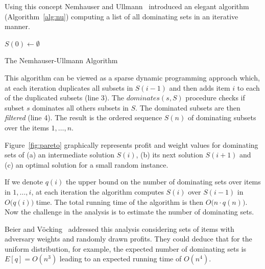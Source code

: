 \documentclass{article}
\begin{document}
Using this concept Nemhauser and Ullmann~\cite{nemhauser1969discrete} introduced an elegant
algorithm (Algorithm~\ref{alg:nu}) computing a list of all dominating sets in an iterative manner.

\begin{algorithm}[H]
 $S(0) \leftarrow \emptyset $\;
 \caption{The Nemhauser-Ullmann Algorithm}
 \label{alg:nu}
\end{algorithm}

This algorithm can be viewed as a sparse dynamic programming approach which,
at each iteration duplicates all subsets in $S(i-1)$ and then adds item $i$
to each of the duplicated subsets (line 3).
The $dominates(s, S)$ procedure checks if subset $s$ dominates all others subsets in $S$.
The dominated subsets are then {\it filtered} (line 4).
The result is the ordered sequence $S(n)$ of dominating subsets over the items $1, \ldots, n$.

Figure~\ref{fig:pareto} graphically represents profit and weight values for
dominating sets of (a) an intermediate solution $S(i)$,
(b) its next solution $S(i+1)$ and (c) an optimal solution for a small random instance.

If we denote $q(i)$ the upper bound on the number of dominating sets over items in
$1, \ldots, i$, at each iteration the algorithm computes $S(i)$ over $S(i-1)$ in $O\big(q(i)\big)$ time.
The total running time of the algorithm is then $O\big(n \cdot q(n)\big)$.
Now the challenge in the analysis is to estimate the number of dominating sets.

Beier and V{\"o}cking~\cite{beier2003random} addressed this analysis considering
sets of items with adversary weights and randomly drawn profits.
They could deduce that for the uniform distribution, for example, the expected
number of dominating sets is $E[q] = O(n^3)$ leading to an expected running
time of $O(n^4)$.
\end{document}
